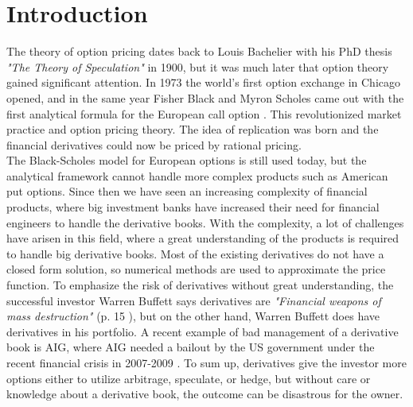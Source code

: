 
\chapter{Introduction} %

\label{Chapter1} %

The theory of option pricing dates back to Louis Bachelier with his PhD thesis \textsl{"The Theory of Speculation"} in 1900, but it was much later that option theory gained significant attention. In 1973 the world's first option exchange in Chicago opened, and in the same year Fisher Black and Myron Scholes came out with the first analytical formula for the European call option \parencite{B-S-Paper}. This revolutionized market practice and option pricing theory. The idea of replication was born and the financial derivatives could now be priced by rational pricing. \\

The Black-Scholes model for European options is still used today, but the analytical framework cannot handle more complex products such as American put options. Since then we have seen an increasing complexity of financial products, where big investment banks have increased their need for financial engineers to handle the derivative books. With the complexity, a lot of challenges have arisen in this field, where a great understanding of the products is required to handle big derivative books. Most of the existing derivatives do not have a closed form solution, so numerical methods are used to approximate the price function. To emphasize the risk of derivatives without great understanding, the successful investor Warren Buffett says derivatives are \textsl{"Financial weapons of mass destruction"} (p. 15 \parencite{Buffett02}), but on the other hand, Warren Buffett does have derivatives in his portfolio. A recent example of bad management of a derivative book is AIG, where AIG needed a bailout by the US government under the recent financial crisis in  2007-2009 \parencite{McDonaldRobert2015}. To sum up, derivatives give the investor more options either to utilize arbitrage, speculate, or hedge, but without care or knowledge about a derivative book, the outcome can be disastrous for the owner.\\

